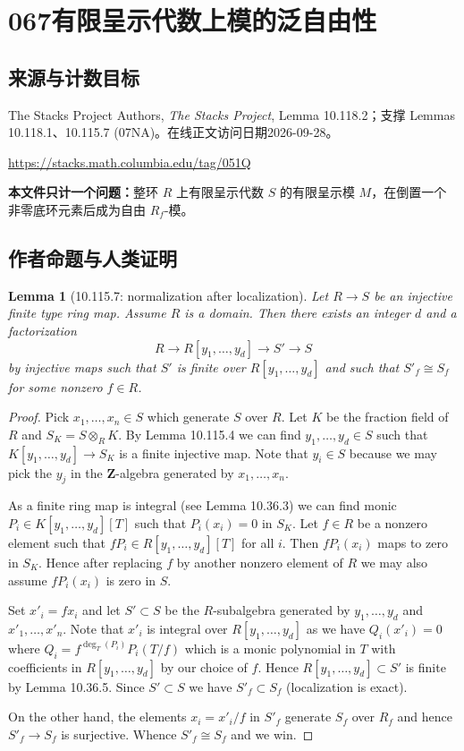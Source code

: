 \documentclass[UTF8,11pt]{ctexart}
\newtheorem*{lemma}{Lemma}
\theoremstyle{definition}
\begin{document}
\section*{067\quad 有限呈示代数上模的泛自由性}
\subsection*{来源与计数目标}
The Stacks Project Authors, \emph{The Stacks Project}, Lemma 10.118.2；支撑 Lemmas 10.118.1、10.115.7 (07NA)。在线正文访问日期2026-09-28。
\par\url{https://stacks.math.columbia.edu/tag/051Q}
\par\textbf{本文件只计一个问题：}整环 $R$ 上有限呈示代数 $S$ 的有限呈示模 $M$，在倒置一个非零底环元素后成为自由 $R_f$-模。
\subsection*{作者命题与人类证明}
\begin{lemma}[10.115.7: normalization after localization]
Let $R\to S$ be an injective finite type ring map. Assume $R$ is a domain. Then there exists an integer $d$ and a factorization
\[R\to R[y_1,\ldots,y_d]\to S'\to S\]
by injective maps such that $S'$ is finite over $R[y_1,\ldots,y_d]$ and such that $S'_f\cong S_f$ for some nonzero $f\in R$.
\end{lemma}
\begin{proof}
Pick $x_1,\ldots,x_n\in S$ which generate $S$ over $R$. Let $K$ be the fraction field of $R$ and $S_K=S\otimes_RK$. By Lemma 10.115.4 we can find $y_1,\ldots,y_d\in S$ such that $K[y_1,\ldots,y_d]\to S_K$ is a finite injective map. Note that $y_i\in S$ because we may pick the $y_j$ in the $\mathbf Z$-algebra generated by $x_1,\ldots,x_n$.

As a finite ring map is integral (see Lemma 10.36.3) we can find monic $P_i\in K[y_1,\ldots,y_d][T]$ such that $P_i(x_i)=0$ in $S_K$. Let $f\in R$ be a nonzero element such that $fP_i\in R[y_1,\ldots,y_d][T]$ for all $i$. Then $fP_i(x_i)$ maps to zero in $S_K$. Hence after replacing $f$ by another nonzero element of $R$ we may also assume $fP_i(x_i)$ is zero in $S$.

Set $x'_i=fx_i$ and let $S'\subset S$ be the $R$-subalgebra generated by $y_1,\ldots,y_d$ and $x'_1,\ldots,x'_n$. Note that $x'_i$ is integral over $R[y_1,\ldots,y_d]$ as we have $Q_i(x'_i)=0$ where $Q_i=f^{\deg_T(P_i)}P_i(T/f)$ which is a monic polynomial in $T$ with coefficients in $R[y_1,\ldots,y_d]$ by our choice of $f$. Hence $R[y_1,\ldots,y_d]\subset S'$ is finite by Lemma 10.36.5. Since $S'\subset S$ we have $S'_f\subset S_f$ (localization is exact).

On the other hand, the elements $x_i=x'_i/f$ in $S'_f$ generate $S_f$ over $R_f$ and hence $S'_f\to S_f$ is surjective. Whence $S'_f\cong S_f$ and we win.
\end{proof}
\end{document}
